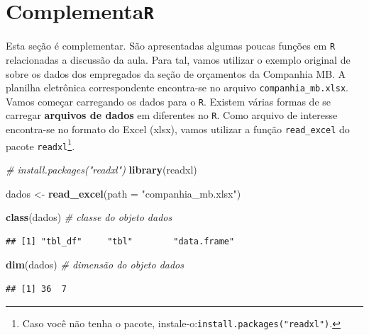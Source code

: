 \documentclass[nofonts,]{tufte-handout}
\newenvironment{Shaded}{\begin{snugshade}}{\end{snugshade}}
\newcommand{\CommentTok}[1]{\textcolor[rgb]{0.56,0.35,0.01}{\textit{#1}}}
\newcommand{\DataTypeTok}[1]{\textcolor[rgb]{0.13,0.29,0.53}{#1}}
\newcommand{\KeywordTok}[1]{\textcolor[rgb]{0.13,0.29,0.53}{\textbf{#1}}}
\newcommand{\NormalTok}[1]{#1}
\newcommand{\StringTok}[1]{\textcolor[rgb]{0.31,0.60,0.02}{#1}}
\begin{document}
\hypertarget{complementar}{%
\section{\texorpdfstring{Complementa\texttt{R}}{ComplementaR}}\label{complementar}}

Esta seção é complementar. São apresentadas algumas poucas funções em
\texttt{R} relacionadas a discussão da aula. Para tal, vamos utilizar o
exemplo original de \citep{morettin_estatistica_2017} sobre os dados dos
empregados da seção de orçamentos da Companhia MB. A planilha eletrônica
correspondente encontra-se no arquivo \texttt{companhia\_mb.xlsx}. Vamos
começar carregando os dados para o \texttt{R}. Existem várias formas de
se carregar \textbf{arquivos de dados} em diferentes no \texttt{R}. Como
arquivo de interesse encontra-se no formato do Excel (xlsx), vamos
utilizar a função \texttt{read\_excel} do pacote
\texttt{readxl}\footnote{Caso você não tenha o pacote,
  instale-o:\texttt{install.packages("readxl")}.}.

\begin{Shaded}
\begin{Highlighting}[]
\CommentTok{# install.packages("readxl")}
\KeywordTok{library}\NormalTok{(readxl)}

\NormalTok{dados <-}\StringTok{ }\KeywordTok{read_excel}\NormalTok{(}\DataTypeTok{path =} \StringTok{"companhia_mb.xlsx"}\NormalTok{)}
\end{Highlighting}
\end{Shaded}

\begin{Shaded}
\begin{Highlighting}[]
\KeywordTok{class}\NormalTok{(dados) }\CommentTok{# classe do objeto dados}
\end{Highlighting}
\end{Shaded}

\begin{verbatim}
## [1] "tbl_df"     "tbl"        "data.frame"
\end{verbatim}

\begin{Shaded}
\begin{Highlighting}[]
\KeywordTok{dim}\NormalTok{(dados) }\CommentTok{# dimensão do objeto dados}
\end{Highlighting}
\end{Shaded}

\begin{verbatim}
## [1] 36  7
\end{verbatim}
\end{document}
